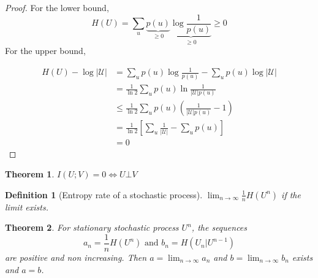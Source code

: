 \documentclass{article}
\newtheorem{theorem}{Theorem}[section]
\newtheorem{definition}{Definition}[section]
\def\U{\mathcal{U}}
\begin{document}
\begin{proof}
For the lower bound,
  \[
    H(U) = \sum_u \underbrace{p(u)}_{\geq 0} \underbrace{\log \frac 1 {p(u)}}_{\geq 0} \geq 0
  \]
For the upper bound,

\begin{align*}
  H(U) - \log | \U |
  &= \sum_u p(u) \log \frac 1 {p(u)} - \sum_u p(u) \log |\U|\\
  &= \frac 1 {\ln 2} \sum_u p(u) \ln \frac 1 {|\U | p(u)}\\
  &\leq \frac 1 {\ln 2} \sum_u p(u) \left(\frac 1 {|\U | p(u)} - 1 \right)\\
  &=\frac 1 {\ln 2} \left[ \sum_u \frac 1 {|\U |} - \sum_u p(u) \right]\\
  &=0
\end{align*}
\end{proof}

\begin{theorem}
  $I(U;V) = 0 \iff U \bot V$
\end{theorem}


\begin{definition}[Entropy rate of a stochastic process]
  $\lim_{n\to \infty} \frac 1 n H(U^n)$ if the limit exists.
\end{definition}

\begin{theorem}
  For stationary stochastic process $U^n$, the sequences
  \[
    a_n = \frac 1 n H(U^n) \text{ and } b_n = H(U_n|U^{n-1})
  \]
  are positive and non increasing. Then $a=\lim_{n\to \infty} a_n$ and $b=\lim_{n\to \infty} b_n$ exists and $a=b$.
\end{theorem}
\end{document}
